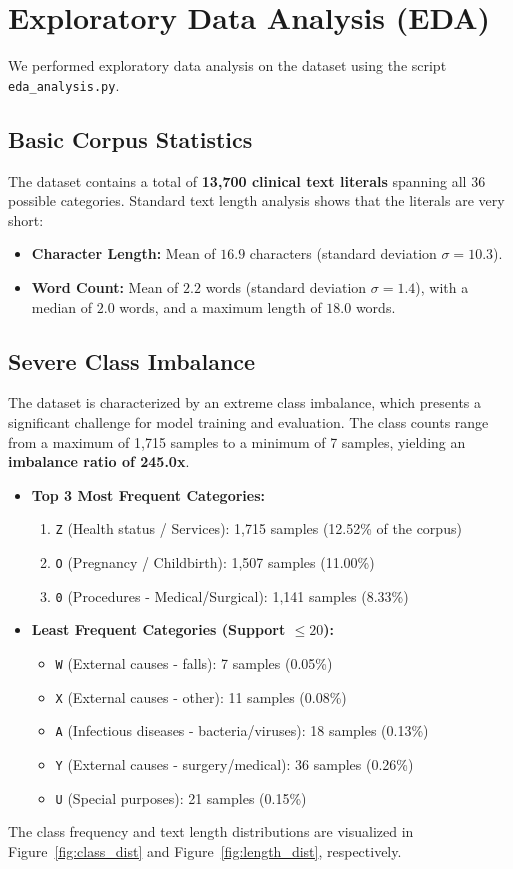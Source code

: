\documentclass[11pt,a4paper]{article}
\begin{document}
\section{Exploratory Data Analysis (EDA)}
We performed exploratory data analysis on the dataset using the script \texttt{eda\_analysis.py}. 

\subsection{Basic Corpus Statistics}
The dataset contains a total of \textbf{13,700 clinical text literals} spanning all 36 possible categories. Standard text length analysis shows that the literals are very short:
\begin{itemize}
    \item \textbf{Character Length:} Mean of $16.9$ characters (standard deviation $\sigma = 10.3$).
    \item \textbf{Word Count:} Mean of $2.2$ words (standard deviation $\sigma = 1.4$), with a median of $2.0$ words, and a maximum length of $18.0$ words.
\end{itemize}

\subsection{Severe Class Imbalance}
The dataset is characterized by an extreme class imbalance, which presents a significant challenge for model training and evaluation. The class counts range from a maximum of 1,715 samples to a minimum of 7 samples, yielding an \textbf{imbalance ratio of 245.0x}.
\begin{itemize}
    \item \textbf{Top 3 Most Frequent Categories:}
    \begin{enumerate}
        \item \texttt{Z} (Health status / Services): 1,715 samples (12.52\% of the corpus)
        \item \texttt{O} (Pregnancy / Childbirth): 1,507 samples (11.00\%)
        \item \texttt{0} (Procedures - Medical/Surgical): 1,141 samples (8.33\%)
    \end{enumerate}
    \item \textbf{Least Frequent Categories (Support $\le 20$):}
    \begin{itemize}
        \item \texttt{W} (External causes - falls): 7 samples (0.05\%)
        \item \texttt{X} (External causes - other): 11 samples (0.08\%)
        \item \texttt{A} (Infectious diseases - bacteria/viruses): 18 samples (0.13\%)
        \item \texttt{Y} (External causes - surgery/medical): 36 samples (0.26\%)
        \item \texttt{U} (Special purposes): 21 samples (0.15\%)
    \end{itemize}
\end{itemize}
The class frequency and text length distributions are visualized in Figure~\ref{fig:class_dist} and Figure~\ref{fig:length_dist}, respectively.
\end{document}
